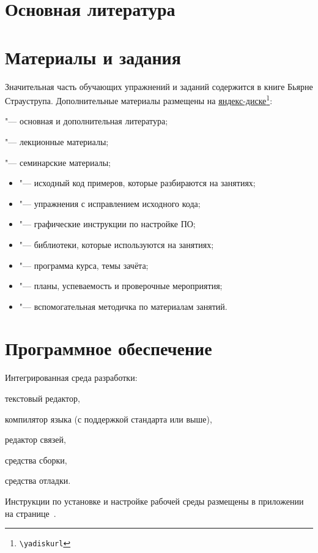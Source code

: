 \section{Основная литература}
\cite{Stroustrup:2016:ru}

\nocite{Kernighan:2004:ru, Meyers:2006:ru, Meyers:2000:ru, Meyers:2002:ru, Meyers:2016:ru, Josuttis:2014:ru, Stroustrup:2006:ru, Stroustrup:2013:en}




\section{Материалы и задания}
Значительная часть обучающих упражнений и заданий содержится в книге Бьярне Страуструпа. Дополнительные материалы размещены на \href{\yadiskurl}{яндекс-диске\footnote{\nolinkurl{\yadiskurl}}}:
\begin{itemfeature}
  \item {} "--- основная и дополнительная литература;
  \item {} "--- лекционные материалы;
  \item {} "--- семинарские материалы;
  \begin{itemize}
  	\item {} "--- исходный код примеров, которые разбираются на занятиях;
  	\item {} "--- упражнения с исправлением исходного кода;
  	\item {} "--- графические инструкции по настройке ПО;
  	\item {} "--- библиотеки, которые используются на занятиях;
  	\item {} "--- программа курса, темы зачёта;
  	\item {} "--- планы, успеваемость и проверочные мероприятия;
  	\item {} "--- вспомогательная методичка по материалам занятий.
  \end{itemize}
\end{itemfeature}



\section{Программное обеспечение}
Интегрированная среда разработки:
\begin{itemfeature}
  \item текстовый редактор,
  \item компилятор языка  (с поддержкой стандарта  или выше),
  \item редактор связей,
  \item средства сборки,
  \item средства отладки.
\end{itemfeature}

Инструкции по установке и настройке рабочей среды размещены в приложении на странице~\pageref{sect:workEnv}.
